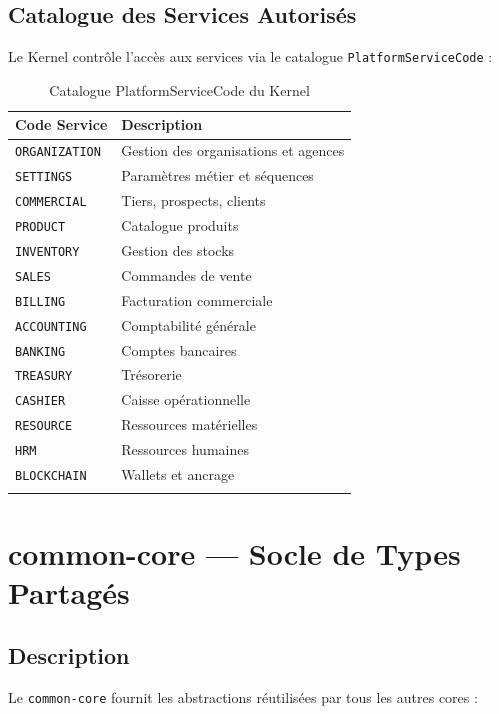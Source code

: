 \documentclass[12pt,a4paper]{report}
\begin{document}
\subsection{Catalogue des Services Autorisés}

Le Kernel contrôle l'accès aux services via le catalogue \texttt{PlatformServiceCode} :

\begin{longtable}{p{4cm}p{9cm}}
\toprule
\textbf{Code Service} & \textbf{Description} \\
\midrule
\endhead
\texttt{ORGANIZATION} & Gestion des organisations et agences \\
\texttt{SETTINGS} & Paramètres métier et séquences \\
\texttt{COMMERCIAL} & Tiers, prospects, clients \\
\texttt{PRODUCT} & Catalogue produits \\
\texttt{INVENTORY} & Gestion des stocks \\
\texttt{SALES} & Commandes de vente \\
\texttt{BILLING} & Facturation commerciale \\
\texttt{ACCOUNTING} & Comptabilité générale \\
\texttt{BANKING} & Comptes bancaires \\
\texttt{TREASURY} & Trésorerie \\
\texttt{CASHIER} & Caisse opérationnelle \\
\texttt{RESOURCE} & Ressources matérielles \\
\texttt{HRM} & Ressources humaines \\
\texttt{BLOCKCHAIN} & Wallets et ancrage \\
\bottomrule
\caption{Catalogue PlatformServiceCode du Kernel}
\end{longtable}

\section{common-core — Socle de Types Partagés}

\subsection{Description}

Le \texttt{common-core} fournit les abstractions réutilisées par tous les autres cores :
\end{document}
